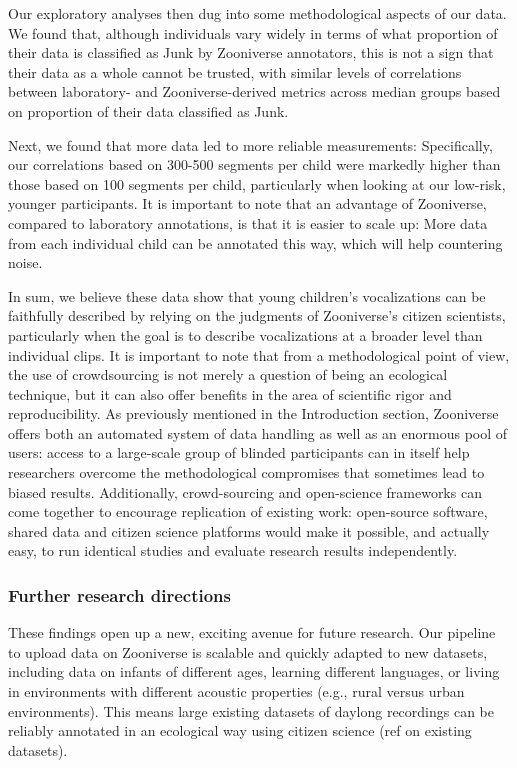 \documentclass[english,,man,floatsintext]{apa6}
\begin{document}
Our exploratory analyses then dug into some methodological aspects of our data. We found that, although individuals vary widely in terms of what proportion of their data is classified as Junk by Zooniverse annotators, this is not a sign that their data as a whole cannot be trusted, with similar levels of correlations between laboratory- and Zooniverse-derived metrics across median groups based on proportion of their data classified as Junk.

Next, we found that more data led to more reliable measurements: Specifically, our correlations based on 300-500 segments per child were markedly higher than those based on 100 segments per child, particularly when looking at our low-risk, younger participants. It is important to note that an advantage of Zooniverse, compared to laboratory annotations, is that it is easier to scale up: More data from each individual child can be annotated this way, which will help countering noise.

In sum, we believe these data show that young children's vocalizations can be faithfully described by relying on the judgments of Zooniverse's citizen scientists, particularly when the goal is to describe vocalizations at a broader level than individual clips. It is important to note that from a methodological point of view, the use of crowdsourcing is not merely a question of being an ecological technique, but it can also offer benefits in the area of scientific rigor and reproducibility. As previously mentioned in the Introduction section, Zooniverse offers both an automated system of data handling as well as an enormous pool of users: access to a large-scale group of blinded participants can in itself help researchers overcome the methodological compromises that sometimes lead to biased results. Additionally, crowd-sourcing and open-science frameworks can come together to encourage replication of existing work: open-source software, shared data and citizen science platforms would make it possible, and actually easy, to run identical studies and evaluate research results independently.

\hypertarget{further-research-directions}{%
\subsubsection{Further research directions}\label{further-research-directions}}

These findings open up a new, exciting avenue for future research. Our pipeline to upload data on Zooniverse is scalable and quickly adapted to new datasets, including data on infants of different ages, learning different languages, or living in environments with different acoustic properties (e.g., rural versus urban environments). This means large existing datasets of daylong recordings can be reliably annotated in an ecological way using citizen science (ref on existing datasets).
\end{document}
